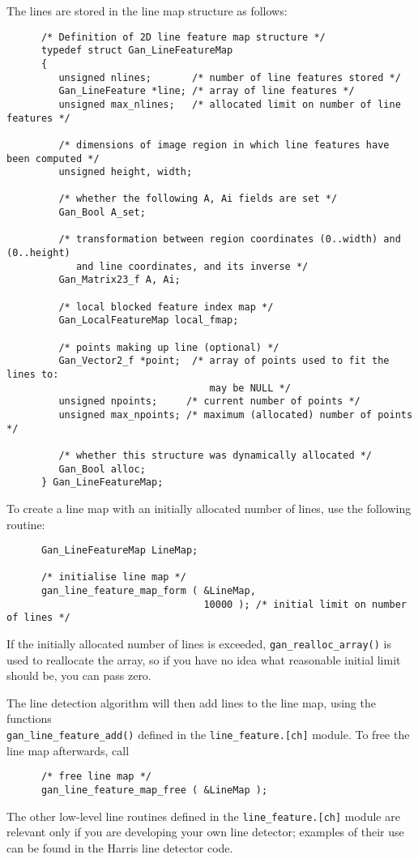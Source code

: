 The lines are stored in the line map structure as follows:
\begin{verbatim}
      /* Definition of 2D line feature map structure */
      typedef struct Gan_LineFeatureMap
      {
         unsigned nlines;       /* number of line features stored */
         Gan_LineFeature *line; /* array of line features */
         unsigned max_nlines;   /* allocated limit on number of line features */

         /* dimensions of image region in which line features have been computed */
         unsigned height, width;

         /* whether the following A, Ai fields are set */
         Gan_Bool A_set;

         /* transformation between region coordinates (0..width) and (0..height)
            and line coordinates, and its inverse */
         Gan_Matrix23_f A, Ai;

         /* local blocked feature index map */
         Gan_LocalFeatureMap local_fmap;

         /* points making up line (optional) */
         Gan_Vector2_f *point;  /* array of points used to fit the lines to:
                                   may be NULL */
         unsigned npoints;     /* current number of points */
         unsigned max_npoints; /* maximum (allocated) number of points */

         /* whether this structure was dynamically allocated */
         Gan_Bool alloc;
      } Gan_LineFeatureMap;
\end{verbatim}

To create a line map with an initially allocated number of lines,
use the following routine:
\begin{verbatim}
      Gan_LineFeatureMap LineMap;

      /* initialise line map */
      gan_line_feature_map_form ( &LineMap,
                                  10000 ); /* initial limit on number of lines */
\end{verbatim}
If the initially allocated number of lines is exceeded,
{\tt gan\_realloc\_array()} is used to reallocate the array,
so if you have no idea what reasonable initial limit should be,
you can pass zero.

The line detection algorithm will then add lines to the line map,
using the functions\\ {\tt gan\_line\_feature\_add()} defined in the
{\tt line\_feature.[ch]} module. To free the line map afterwards, call
\begin{verbatim}
      /* free line map */
      gan_line_feature_map_free ( &LineMap );
\end{verbatim}
The other low-level line routines defined
in the {\tt line\_feature.[ch]} module are
relevant only if you are developing your own line detector; examples
of their use can be found in the Harris line detector code.

